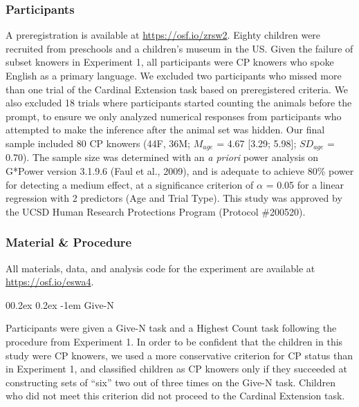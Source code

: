 \documentclass[
  man,floatsintext]{apa7}
\makeatletter
\let\oldparagraph\paragraph
\renewcommand{\paragraph}[1]{\oldparagraph{#1}\mbox{}}
\renewcommand{\paragraph}{\@startsection{paragraph}{4}{\parindent}%
  {0\baselineskip \@plus 0.2ex \@minus 0.2ex}%
  {-1em}%
  {\normalfont\normalsize\bfseries\itshape\typesectitle}}
\renewcommand{\paragraph}{\@startsection{paragraph}{4}{\parindent}%
  {0\baselineskip \@plus 0.2ex \@minus 0.2ex}%
  {-1em}%
  {\normalfont\normalsize\bfseries\typesectitle}}
\makeatother
\begin{document}
\hypertarget{participants-1}{%
\subsubsection{Participants}\label{participants-1}}

A preregistration is available at \url{https://osf.io/zrsw2}.
Eighty children were recruited from preschools and a children's museum in the US. Given the failure of subset knowers in Experiment 1, all participants were CP knowers who spoke English as a primary language. We excluded two participants who missed more than one trial of the Cardinal Extension task based on preregistered criteria. We also excluded 18 trials where participants started counting the animals before the prompt, to ensure we only analyzed numerical responses from participants who attempted to make the inference after the animal set was hidden. Our final sample included 80 CP knowers (44F, 36M; \(M_{age}\) = 4.67 {[}3.29; 5.98{]}; \(SD_{age}\) = 0.70). The sample size was determined with an \emph{a priori} power analysis on G*Power version 3.1.9.6 (Faul et al., 2009), and is adequate to achieve 80\% power for detecting a medium effect, at a significance criterion of \(\alpha\) = 0.05 for a linear regression with 2 predictors (Age and Trial Type). This study was approved by the UCSD Human Research Protections Program (Protocol \#200520).

\hypertarget{material-procedure-1}{%
\subsubsection{Material \& Procedure}\label{material-procedure-1}}

All materials, data, and analysis code for the experiment are available at \url{https://osf.io/eswa4}.

\hypertarget{give-n-1}{%
\paragraph{Give-N}\label{give-n-1}}

Participants were given a Give-N task and a Highest Count task following the procedure from Experiment 1. In order to be confident that the children in this study were CP knowers, we used a more conservative criterion for CP status than in Experiment 1, and classified children as CP knowers only if they succeeded at constructing sets of ``six'' two out of three times on the Give-N task. Children who did not meet this criterion did not proceed to the Cardinal Extension task.
\end{document}
